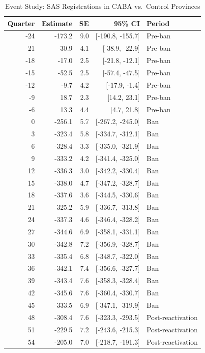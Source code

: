 \begin{table}[htbp]
\centering
\caption{Event Study: SAS Registrations in CABA vs.\ Control Provinces}
\label{tab:es}
\begin{tabular}{rrrrl}
\toprule
Quarter & Estimate & SE & 95\% CI & Period \\
\midrule
-24 & -173.2 & 9.0 & [-190.8, -155.7] & Pre-ban \\
-21 & -30.9 & 4.1 & [-38.9, -22.9] & Pre-ban \\
-18 & -17.0 & 2.5 & [-21.8, -12.1] & Pre-ban \\
-15 & -52.5 & 2.5 & [-57.4, -47.5] & Pre-ban \\
-12 & -9.7 & 4.2 & [-17.9, -1.4] & Pre-ban \\
-9 & 18.7 & 2.3 & [14.2, 23.1] & Pre-ban \\
-6 & 13.3 & 4.4 & [4.7, 21.8] & Pre-ban \\
0 & -256.1 & 5.7 & [-267.2, -245.0] & Ban \\
3 & -323.4 & 5.8 & [-334.7, -312.1] & Ban \\
6 & -328.4 & 3.3 & [-335.0, -321.9] & Ban \\
9 & -333.2 & 4.2 & [-341.4, -325.0] & Ban \\
12 & -336.3 & 3.0 & [-342.2, -330.4] & Ban \\
15 & -338.0 & 4.7 & [-347.2, -328.7] & Ban \\
18 & -337.6 & 3.6 & [-344.5, -330.6] & Ban \\
21 & -325.2 & 5.9 & [-336.7, -313.8] & Ban \\
24 & -337.3 & 4.6 & [-346.4, -328.2] & Ban \\
27 & -344.6 & 6.9 & [-358.1, -331.1] & Ban \\
30 & -342.8 & 7.2 & [-356.9, -328.7] & Ban \\
33 & -335.4 & 6.8 & [-348.7, -322.0] & Ban \\
36 & -342.1 & 7.4 & [-356.6, -327.7] & Ban \\
39 & -343.4 & 7.6 & [-358.3, -328.4] & Ban \\
42 & -345.6 & 7.6 & [-360.4, -330.7] & Ban \\
45 & -333.5 & 6.9 & [-347.1, -319.9] & Ban \\
48 & -308.4 & 7.6 & [-323.3, -293.5] & Post-reactivation \\
51 & -229.5 & 7.2 & [-243.6, -215.3] & Post-reactivation \\
54 & -205.0 & 7.0 & [-218.7, -191.3] & Post-reactivation \\

\end{tabular}
\end{table}
